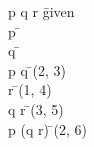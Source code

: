 \documentclass{article}
\begin{document}
\begin{proofbox}
\: p \land q \rightarrow r \= \hbox{given} \\
\open
\: p \= \asm \\
\open
\: q \= \asm \\
\: p \land q \= \andintro(2, 3) \\
\: r \= \implieselim(1, 4) \\
\close
\: q \rightarrow r \= \impliesintro(3, 5) \\
\close
\: p \rightarrow (q \rightarrow r) \= \impliesintro(2, 6) \\
\end{proofbox}
\end{document}
